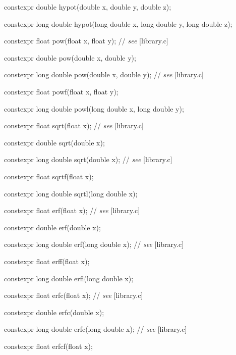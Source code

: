 \documentclass[prd,twocolumn,amsmath,amssymb,nofootinbib,eqsecnum]{revtex4-1}
\newcommand{\highlight}[1]{{\color{green} #1}}
\newcommand{\stdcomment}[1]{{// {\it see} [#1]}}
\begin{document}
{\highlight{constexpr} double hypot(double x, double y, double z);

\highlight{constexpr} long double hypot(long double x, long double y, long double z);

\vspace{2ex}

\highlight{constexpr} float pow(float x, float y); \stdcomment{library.c}

\highlight{constexpr} double pow(double x, double y);

\highlight{constexpr} long double pow(double x, double y); \stdcomment{library.c}

\highlight{constexpr} float powf(float x, float y);

\highlight{constexpr} long double powl(long double x, long double y);

\vspace{2ex}


\highlight{constexpr} float sqrt(float x); \stdcomment{library.c}

\highlight{constexpr} double sqrt(double x);

\highlight{constexpr} long double sqrt(double x); \stdcomment{library.c}

\highlight{constexpr} float sqrtf(float x);

\highlight{constexpr} long double sqrtl(long double x);

\vspace{2ex}


\highlight{constexpr} float erf(float x); \stdcomment{library.c}

\highlight{constexpr} double erf(double x);

\highlight{constexpr} long double erf(long double x); \stdcomment{library.c}

\highlight{constexpr} float erff(float x);

\highlight{constexpr} long double erfl(long double x);

\vspace{2ex}

\highlight{constexpr} float erfc(float x); \stdcomment{library.c}

\highlight{constexpr} double erfc(double x);

\highlight{constexpr} long double erfc(long double x); \stdcomment{library.c}

\highlight{constexpr} float erfcf(float x);

}
\end{document}
